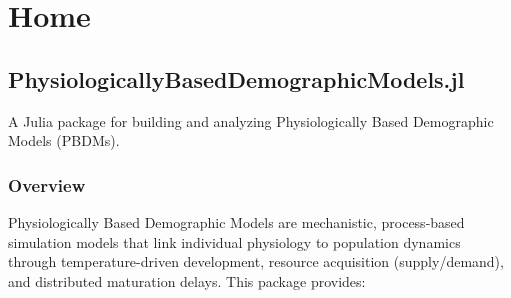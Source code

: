 \newcommand{\DocMainTitle}{PhysiologicallyBasedDemographicModels.jl}
\newcommand{\DocVersion}{}
\newcommand{\DocAuthors}{Simon Frost}
\newcommand{\JuliaVersion}{1.12.5}




\part{Home}


\chapter{PhysiologicallyBasedDemographicModels.jl}



\label{6264695335985347983}{}


A Julia package for building and analyzing Physiologically Based Demographic Models (PBDMs).



\section{Overview}



\label{6515500382253974441}{}


Physiologically Based Demographic Models are mechanistic, process-based simulation models that link individual physiology to population dynamics through temperature-driven development, resource acquisition (supply/demand), and distributed maturation delays. This package provides:



